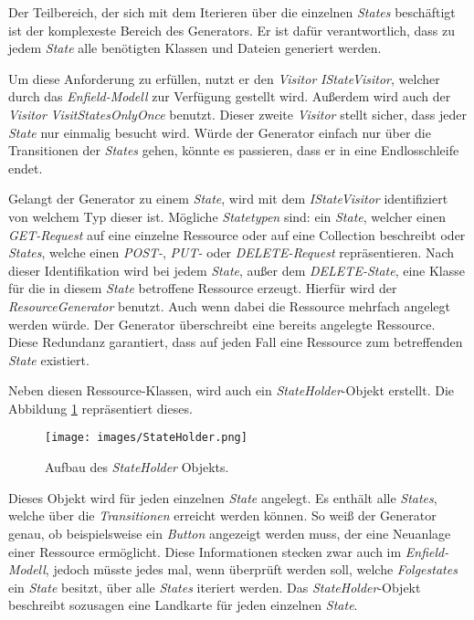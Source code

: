 Der Teilbereich, der sich mit dem Iterieren über die einzelnen \textit{States} beschäftigt ist der komplexeste Bereich des Generators. Er ist dafür verantwortlich, dass zu jedem \textit{State} alle benötigten Klassen und Dateien generiert werden. 

Um diese Anforderung zu erfüllen, nutzt er den \textit{Visitor} \textit{IStateVisitor}, welcher durch das \textit{Enfield-Modell} zur Verfügung gestellt wird. Außerdem wird auch der \textit{Visitor} \textit{VisitStatesOnlyOnce} benutzt. Dieser zweite \textit{Visitor} stellt sicher, dass jeder \textit{State} nur einmalig besucht wird. Würde der Generator einfach nur über die Transitionen der \textit{States} gehen, könnte es passieren, dass er in eine Endlosschleife endet.

\newpage

Gelangt der Generator zu einem \textit{State}, wird mit dem \textit{IStateVisitor} identifiziert von welchem Typ dieser ist. Mögliche \textit{Statetypen} sind: ein \textit{State}, welcher einen \textit{GET-Request} auf eine einzelne Ressource oder auf eine Collection beschreibt oder \textit{States}, welche einen \textit{POST-}, \textit{PUT-} oder \textit{DELETE-Request} repräsentieren.  Nach dieser Identifikation wird bei jedem \textit{State}, außer dem \textit{DELETE-State}, eine Klasse für die in diesem \textit{State} betroffene Ressource erzeugt. Hierfür wird der \textit{ResourceGenerator} benutzt. Auch wenn dabei die Ressource mehrfach angelegt werden würde. Der Generator überschreibt eine bereits angelegte Ressource. Diese Redundanz garantiert, dass auf jeden Fall eine Ressource zum betreffenden \textit{State} existiert. 

Neben diesen Ressource-Klassen, wird auch ein \textit{StateHolder}-Objekt erstellt. Die Abbildung \ref{fig:stateHolder} repräsentiert dieses. 

\begin{figure}[H]
	\begin{center}
		\texttt{[image: images/StateHolder.png]}
		\caption{Aufbau des \textit{StateHolder} Objekts.}
		\label{fig:stateHolder}
	\end{center}
\end{figure}

Dieses Objekt wird für jeden einzelnen \textit{State} angelegt. Es enthält alle \textit{States}, welche über die \textit{Transitionen} erreicht werden können.
So weiß der Generator genau, ob beispielsweise ein \textit{Button} angezeigt werden muss, der eine Neuanlage einer Ressource ermöglicht. Diese Informationen stecken zwar auch im \textit{Enfield-Modell}, jedoch müsste jedes mal, wenn überprüft werden soll, welche \textit{Folgestates} ein \textit{State} besitzt, über alle \textit{States} iteriert werden. Das \textit{StateHolder}-Objekt beschreibt sozusagen eine Landkarte für jeden einzelnen \textit{State}.

